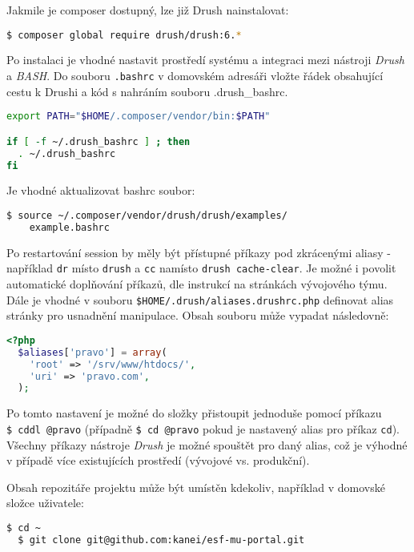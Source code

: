 Jakmile je composer dostupný, lze již Drush nainstalovat:

\begin{lstlisting}[language=bash]
  $ composer global require drush/drush:6.*
\end{lstlisting}

Po instalaci je vhodné nastavit prostředí systému a integraci mezi nástroji \emph{Drush} a \emph{BASH}. Do souboru \texttt{.bashrc} v domovském adresáři vložte řádek obsahující cestu k Drushi a kód s nahráním souboru .drush\_bashrc.

\begin{lstlisting}[language=bash]
export PATH="$HOME/.composer/vendor/bin:$PATH"

if [ -f ~/.drush_bashrc ] ; then
  . ~/.drush_bashrc
fi
\end{lstlisting} 

Je vhodné aktualizovat bashrc soubor:

\begin{lstlisting}[language=bash]
  $ source ~/.composer/vendor/drush/drush/examples/
    example.bashrc
\end{lstlisting} 

Po restartování \gls{session} by měly být přístupné příkazy pod zkrácenými aliasy - například \texttt{dr} místo \texttt{drush} a \texttt{cc} namísto \texttt{drush cache-clear}. Je možné i povolit automatické doplňování příkazů, dle instrukcí na stránkách vývojového týmu. Dále je vhodné v souboru \linebreak\texttt{\$HOME/.drush/aliases.drushrc.php} definovat alias stránky pro usnadnění manipulace. Obsah souboru může vypadat následovně:

\begin{lstlisting}[language=php]
  <?php
  $aliases['pravo'] = array(
    'root' => '/srv/www/htdocs/',
    'uri' => 'pravo.com',
  );
\end{lstlisting}

Po tomto nastavení je možné do složky přistoupit jednoduše pomocí příkazu \texttt{\$~cddl~@pravo} (případně \texttt{\$~cd~@pravo} pokud je nastavený alias pro příkaz \texttt{cd}). Všechny příkazy nástroje \emph{Drush} je možné spouštět pro daný alias, což je výhodné v případě více existujících prostředí (vývojové vs. produkční).

Obsah repozitáře projektu může být umístěn kdekoliv, například v domovské složce uživatele:

\begin{lstlisting}[language=bash]
  $ cd ~
  $ git clone git@github.com:kanei/esf-mu-portal.git  
\end{lstlisting}

